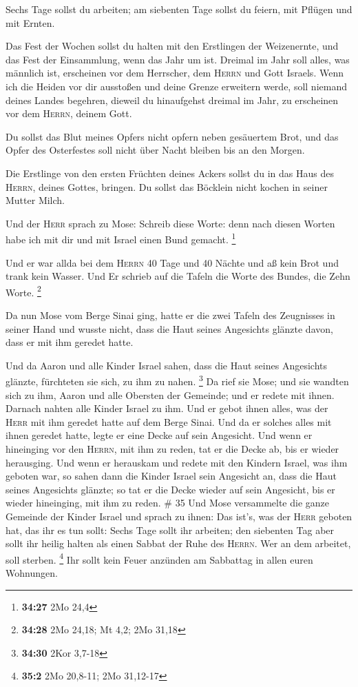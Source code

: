  Sechs Tage sollst du arbeiten; am siebenten Tage sollst
du feiern, mit Pflügen und mit Ernten.

 Das Fest der Wochen sollst du halten mit den Erstlingen
der Weizenernte, und das Fest der Einsammlung, wenn das Jahr um ist.
 Dreimal im Jahr soll alles, was männlich ist, erscheinen
vor dem Herrscher, dem \textsc{Herrn} und Gott Israels. 
Wenn ich die Heiden vor dir ausstoßen und deine Grenze erweitern werde,
soll niemand deines Landes begehren, dieweil du hinaufgehst dreimal im
Jahr, zu erscheinen vor dem \textsc{Herrn}, deinem Gott.

 Du sollst das Blut meines Opfers nicht opfern neben
gesäuertem Brot, und das Opfer des Osterfestes soll nicht über Nacht
bleiben bis an den Morgen.

 Die Erstlinge von den ersten Früchten deines Ackers
sollst du in das Haus des \textsc{Herrn}, deines Gottes, bringen. Du
sollst das Böcklein nicht kochen in seiner Mutter Milch.

 Und der \textsc{Herr} sprach zu Mose: Schreib diese
Worte: denn nach diesen Worten habe ich mit dir und mit Israel einen
Bund gemacht. \footnote{\textbf{34:27} 2Mo 24,4}

 Und er war allda bei dem \textsc{Herrn} 40 Tage und 40
Nächte und aß kein Brot und trank kein Wasser. Und Er schrieb auf die
Tafeln die Worte des Bundes, die Zehn Worte. \footnote{\textbf{34:28}
  2Mo 24,18; Mt 4,2; 2Mo 31,18}

 Da nun Mose vom Berge Sinai ging, hatte er die zwei
Tafeln des Zeugnisses in seiner Hand und wusste nicht, dass die Haut
seines Angesichts glänzte davon, dass er mit ihm geredet hatte.

 Und da Aaron und alle Kinder Israel sahen, dass die Haut
seines Angesichts glänzte, fürchteten sie sich, zu ihm zu nahen.
\footnote{\textbf{34:30} 2Kor 3,7-18}  Da rief sie Mose;
und sie wandten sich zu ihm, Aaron und alle Obersten der Gemeinde; und
er redete mit ihnen.  Darnach nahten alle Kinder Israel
zu ihm. Und er gebot ihnen alles, was der \textsc{Herr} mit ihm geredet
hatte auf dem Berge Sinai.  Und da er solches alles mit
ihnen geredet hatte, legte er eine Decke auf sein Angesicht.
 Und wenn er hineinging vor den \textsc{Herrn}, mit ihm
zu reden, tat er die Decke ab, bis er wieder herausging. Und wenn er
herauskam und redete mit den Kindern Israel, was ihm geboten war,
 so sahen dann die Kinder Israel sein Angesicht an, dass
die Haut seines Angesichts glänzte; so tat er die Decke wieder auf sein
Angesicht, bis er wieder hineinging, mit ihm zu reden. \# 35
 Und Mose versammelte die ganze Gemeinde der Kinder Israel
und sprach zu ihnen: Das ist's, was der \textsc{Herr} geboten hat, das
ihr es tun sollt:  Sechs Tage sollt ihr arbeiten; den
siebenten Tag aber sollt ihr heilig halten als einen Sabbat der Ruhe des
\textsc{Herrn}. Wer an dem arbeitet, soll sterben. \footnote{\textbf{35:2}
  2Mo 20,8-11; 2Mo 31,12-17}  Ihr sollt kein Feuer
anzünden am Sabbattag in allen euren Wohnungen.

